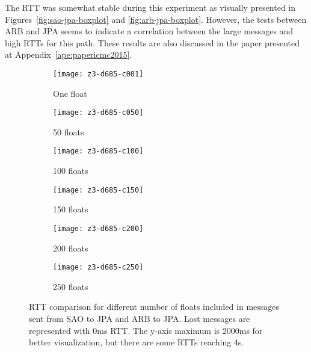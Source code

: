The RTT was somewhat stable during this experiment as visually presented in Figures~\ref{fig:sao-jpa-boxplot} and \ref{fig:arb-jpa-boxplot}.
However, the tests between ARB and JPA seems to indicate a correlation between the large messages and high RTTs for this path.
These results are also discussed in the paper presented at Appendix~\ref{ape:papericmc2015}.

\begin{figure*}[!ht]
	\centering
	\begin{subfigure}{.45\textwidth}
		\texttt{[image: z3-d685-c001]}
		\caption{One float}
		\label{fig:z3-d685-c001}
	\end{subfigure}
	\begin{subfigure}{.45\textwidth}
		\texttt{[image: z3-d685-c050]}
		\caption{50 floats}
		\label{fig:z3-d685-c050}
	\end{subfigure}
	\par\bigskip
	\begin{subfigure}{.45\textwidth}
		\texttt{[image: z3-d685-c100]}
		\caption{100 floats}
		\label{fig:z3-d685-c100}
	\end{subfigure}
	\begin{subfigure}{.45\textwidth}
		\texttt{[image: z3-d685-c150]}
		\caption{150 floats}
		\label{fig:z3-d685-4-c150}
	\end{subfigure}
	\bigskip
	\begin{subfigure}{.45\textwidth}
		\texttt{[image: z3-d685-c200]}
		\caption{200 floats}
		\label{fig:z3-d685-c200}
	\end{subfigure}
	\begin{subfigure}{.45\textwidth}
		\texttt{[image: z3-d685-c250]}
		\caption{250 floats}
		\label{fig:z3-d685-c250}
	\end{subfigure} 
	
	\caption{RTT comparison for different number of floats included in messages sent from SAO to JPA and ARB to JPA. Lost messages are represented with 0ms RTT. The y-axis maximum is 2000ms for better visualization, but there are some RTTs reaching 4s.}
	\label{fig:z3-d685-evaluation}
\end{figure*}

